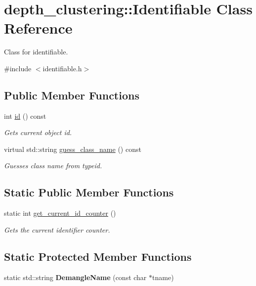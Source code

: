 \hypertarget{classdepth__clustering_1_1Identifiable}{\section{depth\-\_\-clustering\-:\-:Identifiable Class Reference}
\label{classdepth__clustering_1_1Identifiable}
}


Class for identifiable.  




{\ttfamily \#include $<$identifiable.\-h$>$}

\subsection*{Public Member Functions}
\begin{DoxyCompactItemize}
\item 
int \hyperlink{classdepth__clustering_1_1Identifiable_a020b49a5102a2ef0eec7b9e74add7669}{id} () const 
\begin{DoxyCompactList}\small\item\em Gets current object id. \end{DoxyCompactList}\item 
virtual std\-::string \hyperlink{classdepth__clustering_1_1Identifiable_af6769d100c7e7932b71a7f83ce6eafcc}{guess\-\_\-class\-\_\-name} () const 
\begin{DoxyCompactList}\small\item\em Guesses class name from typeid. \end{DoxyCompactList}\end{DoxyCompactItemize}
\subsection*{Static Public Member Functions}
\begin{DoxyCompactItemize}
\item 
static int \hyperlink{classdepth__clustering_1_1Identifiable_a7b3be5250a82404765617ba7239041f1}{get\-\_\-current\-\_\-id\-\_\-counter} ()
\begin{DoxyCompactList}\small\item\em Gets the current identifier counter. \end{DoxyCompactList}\end{DoxyCompactItemize}
\subsection*{Static Protected Member Functions}
\begin{DoxyCompactItemize}
\item 
\hypertarget{classdepth__clustering_1_1Identifiable_a61d070e7b5adbef771d5b4df7b9e2f75}{static std\-::string {\bfseries Demangle\-Name} (const char $\ast$tname)}\label{classdepth__clustering_1_1Identifiable_a61d070e7b5adbef771d5b4df7b9e2f75}

\end{DoxyCompactItemize}

